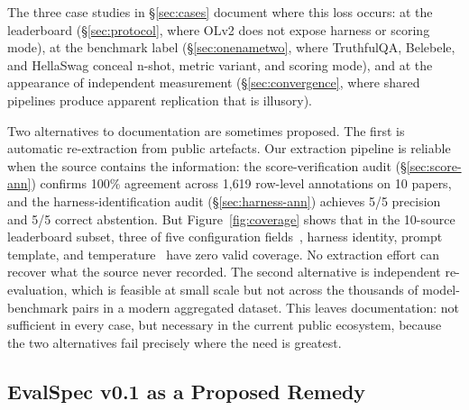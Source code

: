 \documentclass[11pt]{article}
\begin{document}
The three case studies in \S\ref{sec:cases} document where this loss
occurs: at the leaderboard (\S\ref{sec:protocol}, where OLv2 does not
expose harness or scoring mode), at the benchmark label
(\S\ref{sec:onenametwo}, where TruthfulQA, Belebele, and HellaSwag conceal
n-shot, metric variant, and scoring mode), and at the appearance of
independent measurement (\S\ref{sec:convergence}, where shared pipelines
produce apparent replication that is illusory).

Two alternatives to documentation are sometimes proposed. The first is
automatic re-extraction from public artefacts. Our extraction pipeline is
reliable when the source contains the information: the score-verification
audit (\S\ref{sec:score-ann}) confirms 100\% agreement across 1{,}619
row-level annotations on 10 papers, and the harness-identification audit
(\S\ref{sec:harness-ann}) achieves 5/5 precision and 5/5 correct
abstention. But Figure~\ref{fig:coverage} shows that in the 10-source
leaderboard subset, three of five configuration fields~, harness
identity, prompt template, and temperature~ have zero valid coverage.
No extraction effort can recover what the source never recorded. The
second alternative is independent re-evaluation, which is feasible at
small scale but not across the thousands of model-benchmark pairs in a
modern aggregated dataset. This leaves documentation: not sufficient in
every case, but necessary in the current public ecosystem, because the
two alternatives fail precisely where the need is greatest.

\subsection{EvalSpec v0.1 as a Proposed Remedy}
\label{sec:evalspec}
\end{document}
